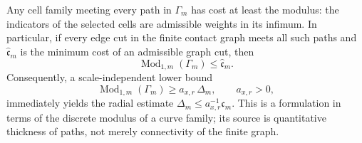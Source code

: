 Any cell family meeting every path in \(\Gamma_m\) has cost at least
the modulus: the indicators of the selected cells are admissible
weights in its infimum. In particular, if every edge cut in the finite
contact graph meets all such paths and \(\widehat{\mathfrak c}_m\) is
the minimum cost of an admissible graph cut, then
\begin{equation}
 \operatorname{Mod}_{1,m}(\Gamma_m)\le\widehat{\mathfrak c}_m.
 \label{eq:modulus-below-cut}
\end{equation}
Consequently, a scale-independent lower bound
\begin{equation}
 \operatorname{Mod}_{1,m}(\Gamma_m)\ge a_{x,r}\,\Delta_m,\qquad
 a_{x,r}>0,
 \label{eq:annular-modulus-target}
\end{equation}
immediately yields the radial estimate
\(\Delta_m\le a_{x,r}^{-1}\widehat{\mathfrak c}_m\). This is a
formulation in terms of the discrete modulus of a curve family; its
source is quantitative thickness of paths, not merely connectivity of
the finite graph.

